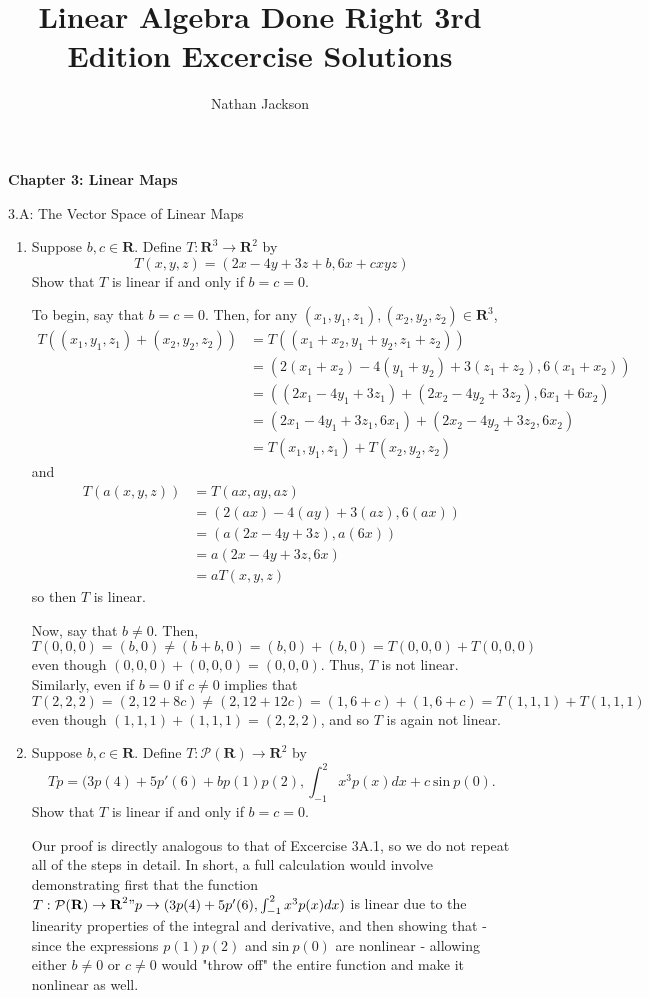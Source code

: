 \documentclass{book}
\title{Linear Algebra Done Right 3rd Edition Excercise Solutions}
\author{Nathan Jackson}
\begin{document}
{\huge \textbf{Chapter 3: Linear Maps}}

3.A: The Vector Space of Linear Maps

\begin{enumerate}

\item Suppose \(b,c \in \textbf{R}\).  Define \(T: \textbf{R}^3 \rightarrow \textbf{R}^2\) by \[T(x,y,z)=(2x-4y+3z+b,6x+cxyz)\] Show that \(T\) is linear if and only if \(b=c=0\).

To begin, say that \(b=c=0\).  Then, for any \((x_1,y_1,z_1),(x_2,y_2,z_2) \in \textbf{R}^3\),
\begin{equation*}
\begin{split}
T((x_1,y_1,z_1)+(x_2,y_2,z_2)) &= T((x_1+x_2,y_1+y_2,z_1+z_2)) \\
&= (2(x_1+x_2)-4(y_1+y_2)+3(z_1+z_2),6(x_1+x_2)) \\
&= ((2x_1-4y_1+3z_1)+(2x_2-4y_2+3z_2),6x_1+6x_2) \\
&= (2x_1-4y_1+3z_1,6x_1)+(2x_2-4y_2+3z_2,6x_2)\\
&= T(x_1,y_1,z_1)+T(x_2,y_2,z_2)
\end{split}
\end{equation*}
and 
\begin{equation*}
\begin{split}
T(a(x,y,z)) &= T(ax,ay,az) \\
&= (2(ax)-4(ay)+3(az),6(ax)) \\
&= (a(2x-4y+3z),a(6x)) \\
&= a(2x-4y+3z,6x) \\
&= aT(x,y,z)
\end{split}
\end{equation*}
so then \(T\) is linear.

Now, say that \(b \neq 0\).  Then, \[T(0,0,0)=(b,0) \neq (b+b,0)=(b,0)+(b,0)=T(0,0,0)+T(0,0,0)\] even though \((0,0,0)+(0,0,0)=(0,0,0)\).  Thus, \(T\) is not linear.  Similarly, even if \(b=0\) if \(c \neq 0\) implies that \[T(2,2,2)=(2,12+8c) \neq (2,12+12c)=(1,6+c)+(1,6+c)=T(1,1,1)+T(1,1,1)\] even though \((1,1,1)+(1,1,1)=(2,2,2)\), and so \(T\) is again not linear.

\item Suppose \(b,c \in \textbf{R}\).  Define \(T: \mathcal{P}(\textbf{R}) \rightarrow \textbf{R}^2\) by \[Tp=(3p(4)+5p'(6)+bp(1)p(2),\int_{-1}^{2} x^3 p(x) dx +c \ \textrm{sin} \ p(0).\] Show that \(T\) is linear if and only if \(b=c=0\).

Our proof is directly analogous to that of Excercise 3A.1, so we do not repeat all of the steps in detail.  In short, a full calculation would involve demonstrating first that the function \(T: \mathcal{P}(\textbf{R}) \rightarrow \textbf{R}^2"p \rightarrow (3p(4)+5p'(6),\int_{-1}^{2} x^3 p(x) dx)\) is linear due to the linearity properties of the integral and derivative, and then showing that - since the expressions \(p(1)p(2)\) and \(\textrm{sin} \ p(0)\) are nonlinear - allowing either \(b \neq 0\) or \(c \neq 0\) would "throw off" the entire function and make it nonlinear as well.


\end{enumerate}
\end{document}

